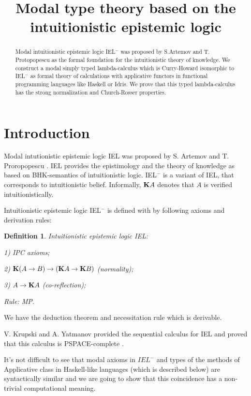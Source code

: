\documentclass[a4paper]{article}
\date{}
\title{Modal type theory based on the intuitionistic epistemic logic}
\newtheorem{defin}{Definition}
\begin{document}
\maketitle

\begin{abstract}
Modal intuitionistic epistemic logic IEL$^{-}$ was proposed by S.Artemov and T. Protopopescu as the formal
foundation for the intuitionistic theory of knowledge. We construct a modal simply typed lambda-calculus
which is Curry-Howard isomorphic to IEL$^{-}$ as formal theory of calculations with applicative functors in
functional programming languages like Haskell or Idris. We prove that this typed lambda-calculus has the
strong normalization and Church-Rosser properties.
\end{abstract}



  \section{Introduction}

  Modal intutionistic epistemic logic IEL was proposed by S. Artemov and T. Proropopescu \cite{Artemov}. IEL
  provides the epistimology and the theory of knowledge as based on BHK-semantics of intuitionistic logic.
  IEL$^{-}$  is a variant of IEL, that corresponds to intuitionistic belief.
  Informally, ${\bf K}A$ denotes that $A$ is verified intuitionistically.

  Intuitionistic epistemic logic IEL$^{-}$ is defined with by following axioms and derivation rules:

  \begin{defin} Intuitionistic epistemic logic IEL:

    1) IPC axioms;

    2) ${\bf K}(A \to B) \to ({\bf K}A \to {\bf K}B)$ (normality);

    3) $A \to {\bf K}A$ (co-reflection);

    Rule: MP.

  \end{defin}

  We have the deduction theorem and necessitation rule which is derivable.

  V. Krupski and  A. Yatmanov provided the sequential calculus for IEL and proved that this calculus is
  PSPACE-complete \cite{Krupski}.

  It's not difficult to see that modal axioms in $IEL^{-}$ and types of the methods of Applicative class in
  Haskell-like languages (which is described below) are syntactically similar and we are going to show that
  this coincidence has a
  non-trivial computational meaning.
\end{document}
